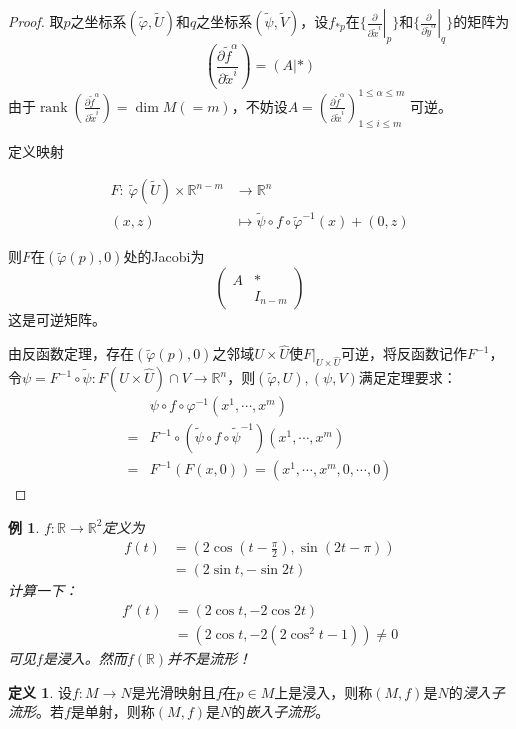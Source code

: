 \documentclass[winfonts,UTF8,c5size,a4paper,fancyhdr,hyperref,titlepage,nocap]{ctexart}
\newtheorem{exa}[thm]{例}
\theoremstyle{definition}
\newtheorem{defn}[thm]{定义}
\theoremstyle{remark}
\numberwithin{equation}{subsection}
\newcommand{\Real}{\mathbb{R}}
\newcommand{\red}{\color{red}}
\newcommand{\pfrac}[2]{\frac{\partial{#1}}{\partial{#2}}}
\newcommand{\rank}{\operatorname{rank}}
\newcommand{\local}[2]{\left.{#1}\right|_{#2}}%
\newcommand{\localp}[1]{\local{#1}{p}}%
\newcommand{\mapdes}[5]
  {
    \begin{align*}
      #1\colon\  #2 & \longrightarrow  #3 \\
            #4 & \mapsto  #5
    \end{align*}
  }
\begin{document}
\begin{proof}
  取$p$之坐标系$(\widetilde{\varphi},\widetilde{U})$和$q$之坐标系$(\widetilde{\psi},\widetilde{V})$，设$f_{\ast p}$在$\{\localp{\pfrac{}{\widetilde{x}^i}}\}$和$\{\local{\pfrac{}{\widetilde{y}^{\alpha}}}{q}\}$的矩阵为
  \begin{equation*}
  (\pfrac{\widetilde{f}^{\alpha}}{\widetilde{x}^i})=(A|\ast)
  \end{equation*}
  由于$\rank(\pfrac{\widetilde{f}^{\alpha}}{\widetilde{x}^i})=\dim M(=m)$，不妨设$A=(\pfrac{\widetilde{f}^{\alpha}}{\widetilde{x}^i})^{1\leqslant\alpha\leqslant m}_{1\leqslant i\leqslant m}$ 可逆。

  定义映射
\mapdes{F}{\widetilde{\varphi}(\widetilde{U})\times\Real^{n-m}}{\Real^n}{(x,z)}{\widetilde{\psi}\circ f\circ\widetilde{\varphi}^{-1}(x)+(0,z)}
则$F$在$(\widetilde{\varphi}(p),0)$处的Jacobi为
\begin{equation*}
\left(
  \begin{array}{cc}
  A&\ast\\
    &I_{n-m}
  \end{array}
\right)
\end{equation*}
这是可逆矩阵。

由反函数定理，存在$(\widetilde{\varphi}(p),0)$之邻域$U\times \widehat{U}$使$F|_{U\times \widehat{U}}$可逆，将反函数记作$F^{-1}$，令$\psi=F^{-1}\circ\widetilde{\psi}\colon F(U\times \widehat{U})\cap V\to\Real^n$，则$(\widetilde{\varphi},U),(\psi,V)$满足定理要求：
\begin{align*}
 &\psi\circ f\circ\varphi^{-1}(x^1,\cdots,x^m)\\
=&F^{-1}\circ(\widetilde{\psi}\circ f\circ\widetilde{\psi}^{-1})(x^1,\cdots,x^m)\\
=&F^{-1}(F(x,0))=(x^1,\cdots,x^m,0,\cdots,0)
\end{align*}
\end{proof}
\begin{exa}
  $f\colon\Real\to\Real^2$定义为
\begin{align*}
f(t)&=(2\cos(t-\frac{\pi}{2}),\sin(2t-\pi))\\
    &=(2\sin t,-\sin 2t)
\end{align*}
计算一下：
\begin{align*}
f'(t)&=(2\cos t,-2\cos 2t)\\
     &=(2\cos t,-2(2\cos^2t-1))\neq0
\end{align*}
可见$f$是浸入。然而$f(\Real)$并不是流形！
\end{exa}
\begin{defn}
  设$f\colon M\to N$是光滑映射且$f$在$p\in M$上是浸入，则称$(M,f)$是$N$的\emph{\red 浸入子流形}。若$f$是单射，则称$(M,f)$是$N$的\emph{\red 嵌入子流形}。
\end{defn}
\end{document}
